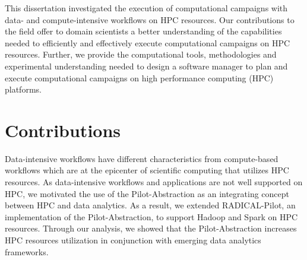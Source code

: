 
This dissertation investigated the execution of computational campaigns with
data- and compute-intensive workflows on HPC resources. Our contributions to the
field offer to domain scientists a better understanding of the capabilities
needed to efficiently and effectively execute computational campaigns on HPC
resources. Further, we provide the computational tools, methodologies and
experimental understanding needed to design a software manager to plan and
execute computational campaigns on high performance computing (HPC) platforms.

\section{Contributions}

Data-intensive workflows have different characteristics from compute-based
workflows which are at the epicenter of scientific computing that utilizes HPC
resources. As
data-intensive workflows and applications are not well supported on HPC, we
motivated the use of the Pilot-Abstraction as an integrating concept between HPC
and data analytics. As a result, we extended RADICAL-Pilot, an implementation of
the Pilot-Abstraction, to support Hadoop and Spark on HPC resources. Through our
analysis, we showed that the Pilot-Abstraction increases HPC resources
utilization in conjunction with emerging data analytics frameworks.

